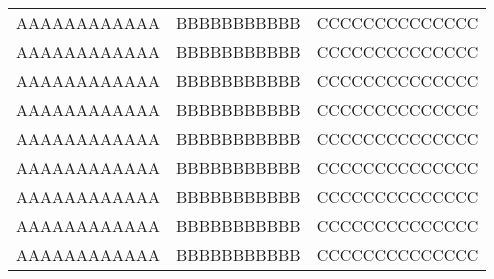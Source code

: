 \begin{longtable}{ccc}
AAAAAAAAAAAA   &   BBBBBBBBBBB   &   CCCCCCCCCCCCCC   \\
AAAAAAAAAAAA   &   BBBBBBBBBBB   &   CCCCCCCCCCCCCC   \\
AAAAAAAAAAAA   &   BBBBBBBBBBB   &   CCCCCCCCCCCCCC   \\
AAAAAAAAAAAA   &   BBBBBBBBBBB   &   CCCCCCCCCCCCCC   \\
AAAAAAAAAAAA   &   BBBBBBBBBBB   &   CCCCCCCCCCCCCC   \\
AAAAAAAAAAAA   &   BBBBBBBBBBB   &   CCCCCCCCCCCCCC   \\
AAAAAAAAAAAA   &   BBBBBBBBBBB   &   CCCCCCCCCCCCCC   \\
AAAAAAAAAAAA   &   BBBBBBBBBBB   &   CCCCCCCCCCCCCC   \\
AAAAAAAAAAAA   &   BBBBBBBBBBB   &   CCCCCCCCCCCCCC   \\
\end{longtable}
